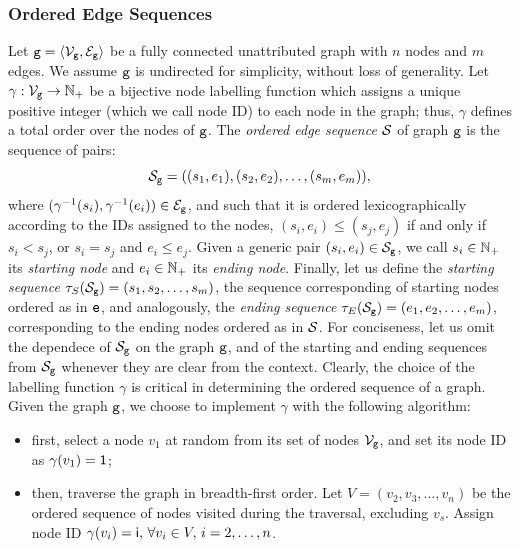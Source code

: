 \subsubsection*{Ordered Edge Sequences}
Let $\Graph{g} = \Tuple{\Nodes{g}, \Edges{g}}$ be a fully connected unattributed graph with $n$ nodes and $m$ edges. We assume $\mathtt{g}$ is undirected for simplicity, without loss of generality. Let $\gamma: \Nodes{g} \shortrightarrow \Natural_{+}$ be a bijective node labelling function which assigns a unique positive integer (which we call node ID) to each node in the graph; thus, $\gamma$ defines a total order over the nodes of $\mathtt{g}$. The \emph{ordered edge sequence} $\Cal{S}$ of graph $\mathtt{g}$ is the sequence of pairs:
$$\OES{S}_{\Graph{g}} = ((s_1, e_1), (s_2, e_2), \ldots, (s_m, e_m)),$$
where $(\gamma^{-1}(s_i), \gamma^{-1}(e_i)) \in \Edges{g}$, and such that it is ordered lexicographically according to the IDs assigned to the nodes, \ie $(s_i,e_i) \leq (s_j,e_j)$ if and only if $s_i < s_j$, or $s_i = s_j$ and $e_i \leq e_j$. Given a generic pair $(s_i,e_i) \in \OES{S}_{\Graph{g}}$, we call $s_i \in \mathbb{N}_{+}$ its \emph{starting node} and $e_i \in \mathbb{N}_{+}$ its \emph{ending node}. Finally, let us define the \emph{starting sequence} $\Start{\OES{S}_{\Graph{g}}} = (s_1, s_2, \ldots, s_m)$, the sequence corresponding of starting nodes ordered as in $\mathtt{e}$, and analogously, the \emph{ending sequence} $\End{\OES{S}_{\Graph{g}}} = (e_1, e_2, \ldots, e_m)$, corresponding to the ending nodes ordered as in $\OES{S}$. For conciseness, let us omit the dependece of $\OES{S}_{\Graph{g}}$ on the graph $\mathtt{g}$, and of the starting and ending sequences from $\OES{S}_{\Graph{g}}$ whenever they are clear from the context. Clearly, the choice of the labelling function $\gamma$ is critical in determining the ordered sequence of a graph. Given the graph $\mathtt{g}$, we choose to implement $\gamma$ with the following algorithm:
\begin{itemize}
    \item first, select a node $v_1$ at random from its set of nodes $\Nodes{g}$, and set its node ID as $\gamma(v_1) = \mathsf{1}$;
    \item then, traverse the graph in breadth-first order. Let $V = (v_2, v_3, \ldots, v_{n})$ be the ordered sequence of nodes visited during the traversal, excluding $v_s$. Assign node ID $\gamma(v_i) = \mathsf{i},\, \forall v_i \in V,\, i=2, \ldots, n$.
\end{itemize}
